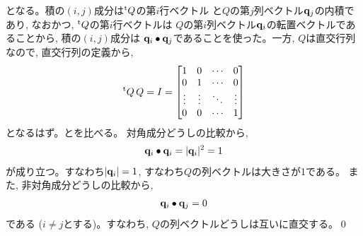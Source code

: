 となる。積の$(i, j)$成分は$^{\text t}Q$の第$i$行ベクトル
と$Q$の第$j$列ベクトル${\bf q}_j$の内積であり, なおかつ, $^{\text t}Q$の第$i$行ベクトルは
$Q$の第$i$列ベクトル${\bf q}_i$の転置ベクトルであることから, 積の$(i, j)$成分は
${\bf q}_i\bullet{\bf q}_j$であることを使った。一方, $Q$は直交行列なので, 直交行列の定義から, 
\begin{eqnarray}
^{\text t}Q\,Q=I=
\begin{bmatrix}
1 & 0 & \cdots & 0\\
0 & 1 & \cdots & 0\\
\vdots & \vdots & \ddots & \vdots\\
0 & 0 & \cdots & 1\\
\end{bmatrix}\label{eq:AB_orthogmatrix_ans6}
\end{eqnarray}
となるはず。とを比べる。
対角成分どうしの比較から, 
\begin{eqnarray*}
{\bf q}_i\bullet{\bf q}_i=|{\bf q}_i|^2=1
\end{eqnarray*}
が成り立つ。すなわち$|{\bf q}_i|=1$, すなわち$Q$の列ベクトルは大きさが1である。
また, 非対角成分どうしの比較から, 
\begin{eqnarray*}
{\bf q}_i\bullet{\bf q}_j=0
\end{eqnarray*}
である ($i\neq j$とする)。すなわち, $Q$の列ベクトルどうしは互いに直交する。\qed
\mv

